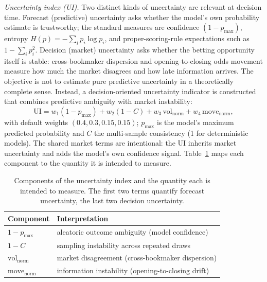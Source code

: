 \documentclass[10pt]{article}
\begin{document}
\emph{Uncertainty index (UI).} Two distinct kinds of uncertainty are relevant
at decision time. Forecast (predictive) uncertainty asks whether the model's
own probability estimate is trustworthy; the standard measures are confidence
$(1-p_{\max})$, entropy $H(p)=-\sum_i p_i \log p_i$, and proper-scoring-rule
expectations such as $1-\sum_i p_i^2$. Decision (market) uncertainty asks
whether the betting opportunity itself is stable: cross-bookmaker dispersion
and opening-to-closing odds movement measure how much the market disagrees and
how late information arrives. The objective is not to estimate pure predictive
uncertainty in a theoretically complete sense. Instead, a decision-oriented
uncertainty indicator is constructed that combines predictive ambiguity with
market instability:
\begin{equation}
  \mathrm{UI} = w_1(1-p_{\max}) + w_2(1-C) + w_3\,\mathrm{vol}_{\mathrm{norm}}
  + w_4\,\mathrm{move}_{\mathrm{norm}},
\label{eq:ui}
\end{equation}
with default weights $(0.4, 0.3, 0.15, 0.15)$; $p_{\max}$ is the model's
maximum predicted probability and $C$ the multi-sample consistency (1 for
deterministic models). The shared market terms are intentional: the UI inherits
market uncertainty and adds the model's own confidence signal.
Table~\ref{tab:uicomp} maps each component to the quantity it is intended to
measure.

\begin{table}[htbp]
\centering
\caption{Components of the uncertainty index and the quantity each is intended
to measure. The first two terms quantify forecast uncertainty, the last two
decision uncertainty.}
\label{tab:uicomp}
\small
\begin{tabular}{ll}
\toprule
Component & Interpretation \\
\midrule
$1-p_{\max}$ & aleatoric outcome ambiguity (model confidence) \\
$1-C$ & sampling instability across repeated draws \\
$\mathrm{vol}_{\mathrm{norm}}$ & market disagreement (cross-bookmaker dispersion) \\
$\mathrm{move}_{\mathrm{norm}}$ & information instability (opening-to-closing drift) \\
\bottomrule
\end{tabular}
\end{table}
\end{document}
